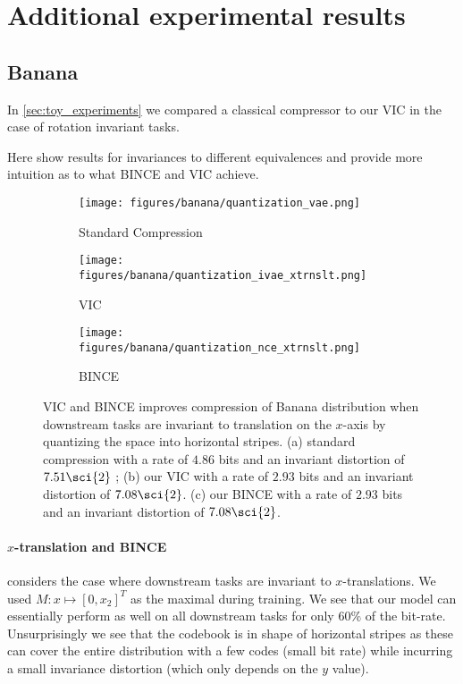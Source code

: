 \documentclass[final]{article}
\begin{document}
\clearpage
\newpage 
\section{Additional experimental results}
\label{appx:results}
\subsection{Banana}
\label{appx:banana}

In \cref{sec:toy_experiments} we compared a classical compressor to our VIC in the case of rotation invariant tasks. 


Here show results for invariances to different equivalences and provide more intuition as to what BINCE and VIC achieve.


\begin{figure}[h]
     \centering
     \begin{subfigure}[h]{0.25\columnwidth}
         \centering
         \texttt{[image: figures/banana/quantization\_vae.png]}
         \caption{Standard Compression}
         \label{fig:bananas_xtrnslt_vae}
     \end{subfigure}
\begin{subfigure}[h]{0.25\columnwidth}
         \centering
         \texttt{[image: figures/banana/quantization\_ivae\_xtrnslt.png]}
         \caption{VIC}
         \label{fig:bananas_xtrnslt_ivae}
     \end{subfigure}
\begin{subfigure}[h]{0.25\columnwidth}
         \centering
         \texttt{[image: figures/banana/quantization\_nce\_xtrnslt.png]}
         \caption{BINCE}
         \label{fig:bananas_xtrnslt_bince}
     \end{subfigure}
\caption{
VIC and BINCE improves compression of Banana distribution when downstream tasks are invariant to translation on the $x$-axis by quantizing the space into horizontal stripes.
(a) standard compression with a rate of $4.86$ bits and an invariant distortion of $7.51\sci{2}$ ; (b) our VIC with a rate of $2.93$ bits and an invariant distortion of $7.08\sci{2}$.
(c) our BINCE with a rate of $2.93$ bits and an invariant distortion of $7.08\sci{2}$.
}
\label{fig:bananas_xtrnslt}
\vspace{-0.5em}
\end{figure} 
\paragraph{$x$-translation and BINCE}
 considers the case where downstream tasks are invariant to $x$-translations.
We used $M : x \mapsto [0,x_2]^T$ as the maximal during training.
We see that our model can essentially perform as well on all downstream tasks for only $60 \%$ of the bit-rate.
Unsurprisingly we see that the codebook is in shape of horizontal stripes as these can cover the entire distribution with a few codes (small bit rate) while incurring a small invariance distortion (which only depends on the $y$ value).
\end{document}
